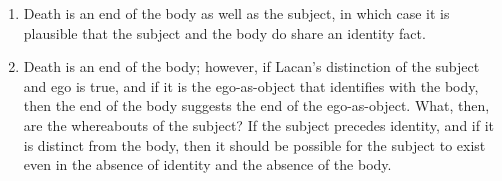 \begin{enumerate}
	\item Death is an end of the body as well as the subject, in which case it
is plausible that the subject and the body do share an identity fact.

	\item Death is an end of the body; however, if Lacan's distinction of the
subject and ego is true, and if it is the ego-as-object that identifies
with the body, then the end of the body suggests the end of the
ego-as-object. What, then, are the whereabouts of the subject? If the
subject precedes identity, and if it is distinct from the body, then it
should be possible for the subject to exist even in the absence of
identity and the absence of the body.
\end{enumerate}

